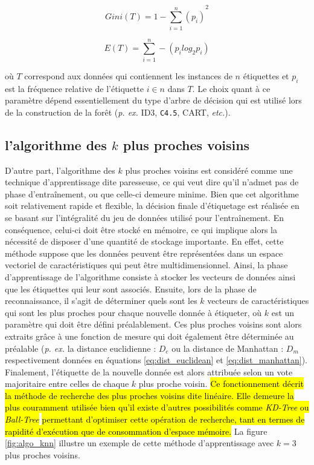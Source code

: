 \begin{equation}
	\label{eq:gini}
	Gini(T) = {1-\sum_{i=1}^{n}(p_i)}^2
\end{equation}

\begin{equation}
	\label{eq:gain}
	E(T) = \sum_{i=1}^{n}-(p_i log_2 p_i)
\end{equation}

\noindent où $T$ correspond aux données qui contiennent les instances de $n$ étiquettes et $p_i$ est la fréquence relative de l'étiquette $i \in n$ dans $T$. Le choix quant à ce paramètre dépend essentiellement du type d'arbre de décision qui est utilisé lors de la construction de la forêt (\textit{p. ex.} ID3, \texttt{C4.5}, CART, \textit{etc.}).

\subsection{l'algorithme des $k$ plus proches voisins}

D'autre part, l'algorithme des $k$ plus proches voisins est considéré comme une technique d'apprentissage dite \og{}paresseuse\fg{}, ce qui veut dire qu'il n'admet pas de phase d'entraînement, ou que celle-ci demeure minime. Bien que cet algorithme soit relativement rapide et flexible, la décision finale d'étiquetage est réalisée en se basant sur l'intégralité du jeu de données utilisé pour l'entraînement. En conséquence, celui-ci doit être stocké en mémoire, ce qui implique alors la nécessité de disposer d'une quantité de stockage importante. En effet, cette méthode suppose que les données peuvent être représentées dans un espace vectoriel de caractéristiques qui peut être multidimensionnel. Ainsi, la phase d'apprentissage de l'algorithme consiste à stocker les vecteurs de données ainsi que les étiquettes qui leur sont associés. Ensuite, lors de la phase de reconnaissance, il s'agit de déterminer quels sont les $k$ vecteurs de caractéristiques qui sont les plus proches pour chaque nouvelle donnée à étiqueter, où $k$ est un paramètre qui doit être défini préalablement. Ces plus proches voisins sont alors extraits grâce à une fonction de mesure qui doit également être déterminée au préalable (\textit{p. ex.} la distance euclidienne : $D_e$ ou la distance de Manhattan : $D_m$ respectivement données en équations \ref{eq:dist_euclidean} et \ref{eq:dist_manhattan}). Finalement, l'étiquette de la nouvelle donnée est alors attribuée selon un vote majoritaire entre celles de chaque $k$ plus proche voisin. \hl{Ce fonctionnement décrit la méthode de recherche des plus proches voisins dite linéaire. Elle demeure la plus couramment utilisée bien qu'il existe d'autres possibilités comme \textit{KD-Tree} ou \textit{Ball-Tree}} \citep{Bhatia2010} \hl{permettant d'optimiser cette opération de recherche, tant en termes de rapidité d'exécution que de consommation d'espace mémoire.} La figure \ref{fig:algo_knn} illustre un exemple de cette méthode d'apprentissage avec $k=3$ plus proches voisins.

